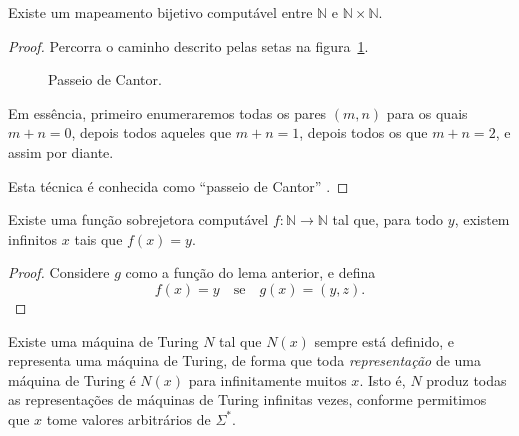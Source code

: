 \begin{lemma}
    Existe um mapeamento bijetivo computável
    entre $\mathbb N$ e $\mathbb N \times \mathbb N$.
\end{lemma}

\begin{proof}
    Percorra o caminho descrito pelas setas na figura~\ref{passeio_cantor}.

    \begin{figure}[h]
        \centering
        \caption{Passeio de Cantor.}
        \label{passeio_cantor}
    \end{figure}

    Em essência, primeiro enumeraremos todas os pares $(m, n)$
    para os quais $m + n = 0$,
    depois todos aqueles que $m + n = 1$,
    depois todos os que $m + n = 2$,
    e assim por diante.

    Esta técnica é conhecida como ``passeio de Cantor''
    \cite[p.~6]{CarnielliConiglioBianconi2006}.
\end{proof}

\begin{lemma}
    Existe uma função sobrejetora computável
    $f: \mathbb N \rightarrow \mathbb N$
    tal que,
    para todo $y$,
    existem infinitos $x$ tais que $f(x) = y$.
\end{lemma}
\begin{proof}
    Considere $g$ como a função do lema anterior,
    e defina
    \begin{equation*}
        f(x) = y \quad \text{se} \quad g(x) = (y, z).
    \end{equation*}
\end{proof}

\begin{lemma}
    Existe uma máquina de Turing $N$
    tal que $N(x)$ sempre está definido,
    e representa uma máquina de Turing,
    de forma que toda \emph{representação}
    de uma máquina de Turing
    é $N(x)$ para infinitamente muitos $x$.
    Isto é, $N$ produz todas as representações de máquinas de Turing
    infinitas vezes,
    conforme permitimos que $x$ tome valores arbitrários de $\Sigma^*$.
\end{lemma}

